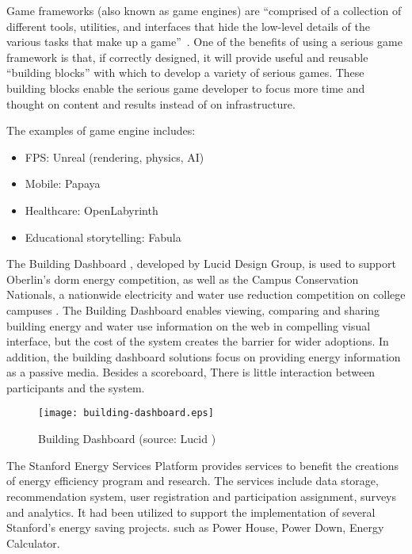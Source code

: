 Game frameworks (also known as game engines) are ``comprised of a collection
of different tools, utilities, and interfaces that hide the low-level details of the
various tasks that make up a game''~\cite{sherrod2006ultimate}. One of the benefits of
using a serious game framework is that, if correctly designed, it will provide useful and
reusable ``building blocks'' with which to develop a variety of serious games.  These
building blocks enable the serious game developer to focus more time and thought on
content and results instead of on infrastructure.

The examples of game engine includes:
\begin {itemize}
    \item FPS: Unreal (rendering, physics, AI)
    \item Mobile: Papaya
    \item Healthcare: OpenLabyrinth
    \item Educational storytelling: Fabula
\end {itemize}

The Building Dashboard \cite{building-dashboard}, developed by Lucid Design
Group, is used to support Oberlin's dorm energy competition,
as well as the Campus Conservation Nationals, a nationwide electricity and
water use reduction competition on college campuses \cite{competetoreduce}.
The Building Dashboard enables viewing, comparing and sharing building energy
and water use information on the web in compelling visual interface, but the
cost of the system creates the barrier for wider adoptions. In addition, the
building dashboard solutions focus on providing energy information as
a passive media. Besides a scoreboard, There is little interaction between participants
and the system.

\begin{figure}[htbp]
	\centering
		\texttt{[image: building-dashboard.eps]}
		\caption{Building Dashboard (source: Lucid \cite{building-dashboard})}
		\label{fig:building-dashboard}
\end{figure}

The Stanford Energy Services Platform \cite{Armel-2012} provides services to benefit the creations of energy efficiency program and research. The services include data storage, recommendation system,
user registration and participation assignment, surveys and analytics. It had been utilized to support
the implementation of several Stanford's energy saving projects. such as Power House, Power Down,
Energy Calculator.


